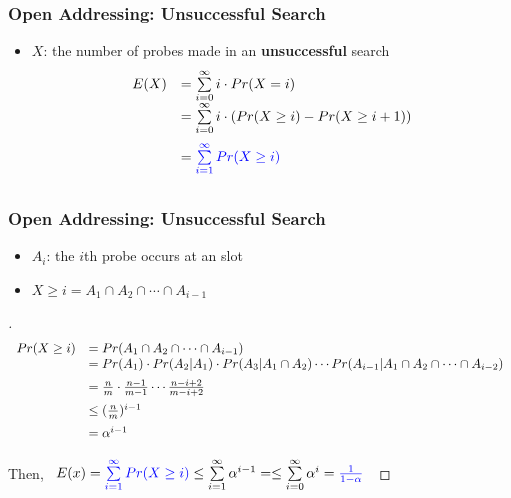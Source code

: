 \documentclass[UTF8,11pt]{beamer}
\begin{document}
\begin{frame}
\frametitle{Open Addressing: Unsuccessful Search}
\begin{center}
	\pause
\end{center}
\begin{itemize}
	\pause
	\item {\color{blue}$X$}: the number of probes made in an \textbf{unsuccessful} search
	\pause
	\[
	\begin{array}{ll}
	E(X)&=\sum\limits_{i=0}^{\infty}{i\cdot Pr(X=i)}\\\vspace{0.2cm}
	&=\sum\limits_{i=0}^{\infty}{i\cdot( Pr(X\ge i)-Pr(X\ge i+1))}\\\vspace{0.2cm}
	&={\color{blue}\sum\limits_{i=1}^{\infty}{Pr(X\ge i)}}
	\end{array}
	\]
\end{itemize}
\end{frame}

\begin{frame}
\frametitle{Open Addressing: Unsuccessful Search}
\begin{itemize}
	\pause\item $A_i$: the $i$th probe occurs at an  slot
	\pause\item $X\ge i=A_1\cap A_2\cap\cdots\cap A_{i-1}$

\end{itemize}
\begin{proof}[]
	\pause
	{\footnotesize\[
	\begin{array}{ll}
	Pr(X\ge i)&=Pr(A_1\cap A_2\cap\cdots\cap A_{i-1})\\\vspace{0.2cm}
	&=Pr(A_1)\cdot Pr(A_2|A_1)\cdot Pr(A_3|A_1\cap A_2)\cdots Pr(A_{i-1}|A_1\cap A_2\cap\cdots\cap A_{i-2})\\\vspace{0.2cm}
	&=\frac{n}{m}\cdot\frac{n-1}{m-1}\cdots\frac{n-i+2}{m-i+2}\\\vspace{0.2cm}
	&\le (\frac{n}{m})^{i-1}\\\vspace{0.2cm}
	&=\alpha^{i-1}
	\end{array}
	\]
	}
	\pause
	Then, 
		$\begin{array}{ll}
		E(x)={\color{blue}\sum\limits_{i=1}^{\infty}{Pr(X\ge i)}}
		\le\sum\limits_{i=1}^{\infty}{\alpha^{i-1}}
		=\le\sum\limits_{i=0}^{\infty}{\alpha^{i}}=\textcolor{blue}{\frac{1}{1-\alpha}}		
	\end{array}$

\end{proof}
\end{frame}
\end{document}
